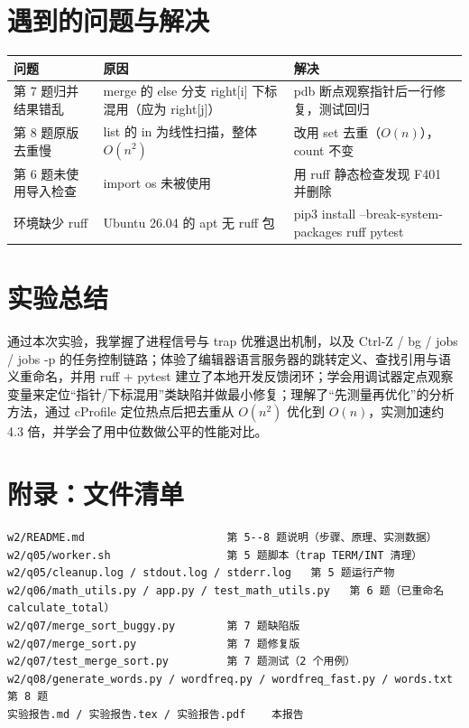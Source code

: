 \documentclass[UTF8,fontset=ubuntu]{ctexart}
\begin{document}
\section{遇到的问题与解决}
\begin{center}
\begin{tabular}{@{}p{5cm}p{5.2cm}p{5cm}@{}}
\toprule
问题 & 原因 & 解决 \\
\midrule
第 7 题归并结果错乱 & merge 的 else 分支 right[i] 下标混用（应为 right[j]） & pdb 断点观察指针后一行修复，测试回归 \\
第 8 题原版去重慢 & list 的 in 为线性扫描，整体 $O(n^2)$ & 改用 set 去重（$O(n)$），count 不变 \\
第 6 题未使用导入检查 & import os 未被使用 & 用 ruff 静态检查发现 F401 并删除 \\
环境缺少 ruff & Ubuntu 26.04 的 apt 无 ruff 包 & pip3 install --break-system-packages ruff pytest \\
\bottomrule
\end{tabular}
\end{center}

\section{实验总结}
通过本次实验，我掌握了进程信号与 trap 优雅退出机制，以及 Ctrl-Z / bg / jobs / jobs -p 的任务控制链路；体验了编辑器语言服务器的跳转定义、查找引用与语义重命名，并用 ruff + pytest 建立了本地开发反馈闭环；学会用调试器定点观察变量来定位“指针/下标混用”类缺陷并做最小修复；理解了“先测量再优化”的分析方法，通过 cProfile 定位热点后把去重从 $O(n^2)$ 优化到 $O(n)$，实测加速约 4.3 倍，并学会了用中位数做公平的性能对比。

\section*{附录：文件清单}
\begin{lstlisting}
w2/README.md                      第 5--8 题说明（步骤、原理、实测数据）
w2/q05/worker.sh                  第 5 题脚本（trap TERM/INT 清理）
w2/q05/cleanup.log / stdout.log / stderr.log   第 5 题运行产物
w2/q06/math_utils.py / app.py / test_math_utils.py   第 6 题（已重命名 calculate_total）
w2/q07/merge_sort_buggy.py        第 7 题缺陷版
w2/q07/merge_sort.py              第 7 题修复版
w2/q07/test_merge_sort.py         第 7 题测试（2 个用例）
w2/q08/generate_words.py / wordfreq.py / wordfreq_fast.py / words.txt   第 8 题
实验报告.md / 实验报告.tex / 实验报告.pdf    本报告
\end{lstlisting}
\end{document}
